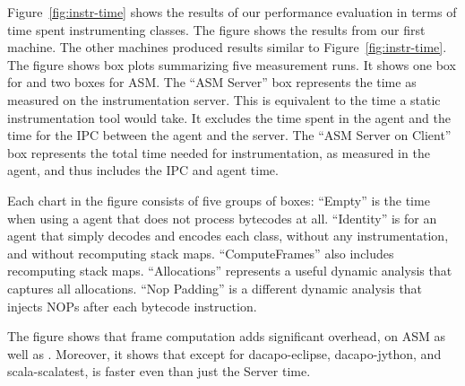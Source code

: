 Figure~\ref{fig:instr-time} shows the results of our performance evaluation
in terms of time spent instrumenting classes.
The figure shows the results from our first machine.
The other machines produced results similar to Figure~\ref{fig:instr-time}.
The figure shows box plots summarizing five measurement runs.
It shows one box for \jnif{} and two boxes for ASM.
The ``ASM Server'' box represents the time as measured on the instrumentation server.
This is equivalent to the time a static instrumentation tool would take.
It excludes the time spent in the \jvmti{} agent and the time for the IPC between the agent and the server.
The ``ASM Server on Client'' box represents the total time needed for instrumentation, 
as measured in the \jvmti{} agent,
and thus includes the IPC and \jvmti{} agent time.

Each chart in the figure consists of five groups of boxes:
``Empty'' is the time when using a \jvmti{} agent that does not process bytecodes at all.
``Identity'' is for an agent that simply decodes and encodes each class, without any instrumentation, and without recomputing stack maps.
``ComputeFrames'' also includes recomputing stack maps.
``Allocations'' represents a useful dynamic analysis that captures all allocations.
``Nop Padding'' is a different dynamic analysis that injects NOPs after each bytecode instruction. 

The figure shows that frame computation adds significant overhead,
on ASM as well as \jnif{}.
Moreover, it shows that except for dacapo-eclipse, dacapo-jython, and scala-scalatest,
\jnif{} is faster even than just the \asm{} Server time.




